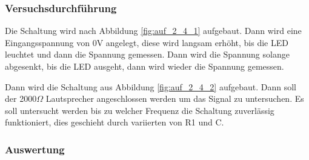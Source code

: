 \documentclass[12pt,a4paper]{article}
\begin{document}
\subsubsection*{Versuchsdurchführung}

Die Schaltung wird nach Abbildung \ref{fig:auf_2_4_1} aufgebaut. Dann wird eine Eingangsspannung von 0V angelegt, diese wird langsam erhöht, bis die LED leuchtet und dann die Spannung gemessen. Dann wird die Spannung solange abgesenkt, bis die LED ausgeht, dann wird wieder die Spannung gemessen.

Dann wird die Schaltung aus Abbildung \ref{fig:auf_2_4_2} aufgebaut. Dann soll der 2000$\Omega$ Lautsprecher angeschlossen werden um das Signal zu untersuchen. Es soll untersucht werden bis zu welcher Frequenz die Schaltung zuverlässig funktioniert, dies geschieht durch variierten von R1 und C.

\subsubsection*{Auswertung}
\end{document}
